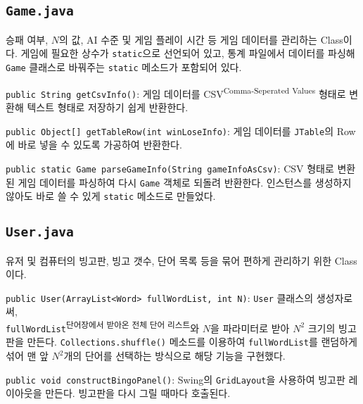 


\subsection{\texttt{Game.java}}
승패 여부, $N$의 값, AI 수준 및 게임 플레이 시간 등 게임 데이터를 관리하는 Class이다.
게임에 필요한 상수가 \texttt{static}으로 선언되어 있고, 통계 파일에서 데이터를 파싱해 \texttt{Game} 클래스로 바꿔주는 \texttt{static} 메소드가 포함되어 있다.

\texttt{public String getCsvInfo()}:
게임 데이터를 CSV\textsuperscript{Comma-Seperated Values} 형태로 변환해 텍스트 형태로 저장하기 쉽게 반환한다.

\texttt{public Object[] getTableRow(int winLoseInfo)}:
게임 데이터를 \texttt{JTable}의 Row에 바로 넣을 수 있도록 가공하여 반환한다.

\texttt{public static Game parseGameInfo(String gameInfoAsCsv)}:
CSV 형태로 변환된 게임 데이터를 파싱하여 다시 \texttt{Game} 객체로 되돌려 반환한다.
인스턴스를 생성하지 않아도 바로 쓸 수 있게 \texttt{static} 메소드로 만들었다.

\newpage
\subsection{\texttt{User.java}}
유저 및 컴퓨터의 빙고판, 빙고 갯수, 단어 목록 등을 묶어 편하게 관리하기 위한 Class이다.

\texttt{public User(ArrayList<Word> fullWordList, int N)}:
\texttt{User} 클래스의 생성자로써,\\\texttt{fullWordList}\textsuperscript{단어장에서 받아온 전체 단어 리스트}와 $N$을 파라미터로 받아 $N^2$ 크기의 빙고판을 만든다.
\texttt{Collections.shuffle()} 메소드를 이용하여 \texttt{fullWordList}를 랜덤하게 섞어 맨 앞 $N^2$개의 단어를 선택하는 방식으로 해당 기능을 구현했다.

\texttt{public void constructBingoPanel()}:
Swing의 \texttt{GridLayout}을 사용하여 빙고판 레이아웃을 만든다. 빙고판을 다시 그릴 때마다 호출된다.

